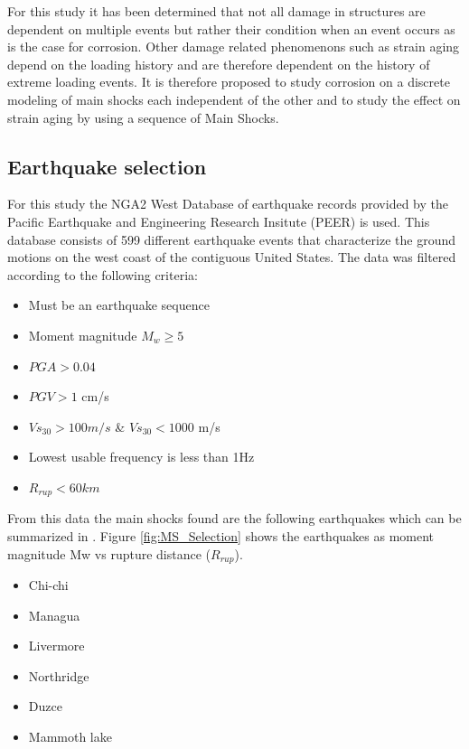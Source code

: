 For this study it has been determined that not all damage in structures are dependent on multiple events but rather their condition when an event occurs as is the case for corrosion. Other damage related phenomenons such as strain aging depend on the loading history and are therefore dependent on the history of extreme loading events. It is therefore proposed to study corrosion on a discrete modeling of main shocks each independent of the other and to study the effect on strain aging by using a sequence of Main Shocks.

\subsection{Earthquake selection}

For this study the NGA2 West Database of earthquake records provided by the Pacific Earthquake and Engineering Research Insitute (PEER) \cite{Ancheta2014} is used. This database consists of 599 different earthquake events that characterize the ground motions on the west coast of the contiguous United States. The data was filtered according to the following criteria:

\begin{itemize}
	\item Must be an earthquake sequence
	\item Moment magnitude $M_w \geqslant 5$
	\item $PGA>0.04$
	\item $PGV>1$ cm/s
	\item $Vs_{30}>100m/s$ \& $Vs_{30}<1000$ m/s
	\item Lowest usable frequency is less than 1Hz
	\item $R_{rup}<60km$
\end{itemize}

From this data the main shocks found are the following earthquakes which can be summarized in . Figure \ref{fig:MS_Selection} shows the earthquakes as moment magnitude {Mw} vs rupture distance ($R_{rup}$).

\begin{itemize}
	\item Chi-chi
	\item Managua
	\item Livermore
	\item Northridge
	\item Duzce 
	\item Mammoth lake
\end{itemize}

